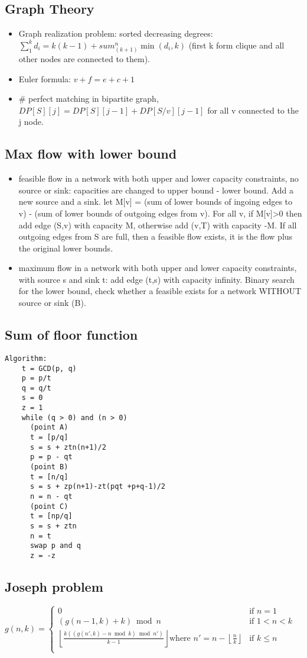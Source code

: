 \subsection{Graph Theory}
\begin{itemize}
\item Graph realization problem: sorted decreasing degrees: $\sum_1^k d_i = k(k-1)+sum_(k+1)^n \min(d_i,k)$ (first k form clique and all other nodes are connected to them).
\item Euler formula: $v+f = e+c+1$
\item \# perfect matching in bipartite graph, $DP[S][j] = DP[S][j-1] + DP[S/{v}][j-1]$ for all v connected to the j node.
\end{itemize}
\hrulefill
\subsection{Max flow with lower bound}
\begin{itemize}
\item feasible flow in a network with both upper and lower capacity constraints, no source or sink: capacities are changed to upper bound - lower bound. Add a new source and a sink. let M[v] = (sum of lower bounds of ingoing edges to v) - (sum of lower bounds of outgoing edges from v). For all v, if M[v]>0 then add edge (S,v) with capacity M, otherwise add (v,T) with capacity -M. If all outgoing edges from S are full, then a feasible flow exists, it is the flow plus the original lower bounds.
\item maximum flow in a network with both upper and lower capacity constraints, with source s and sink t: add edge (t,s) with capacity infinity. Binary search for the lower bound, check whether a feasible exists for a network WITHOUT source or sink (B).
\end{itemize}
\hrulefill
\subsection{Sum of floor function}
\raggedbottom\begin{lstlisting}[style=txt]
Algorithm:
    t = GCD(p, q)
    p = p/t
    q = q/t
    s = 0
    z = 1
    while (q > 0) and (n > 0)
      (point A)
      t = [p/q]
      s = s + ztn(n+1)/2
      p = p - qt
      (point B)
      t = [n/q]
      s = s + zp(n+1)-zt(pqt +p+q-1)/2
      n = n - qt
      (point C)
      t = [np/q]
      s = s + ztn
      n = t
      swap p and q
      z = -z
\end{lstlisting}
\hrulefill
\subsection{Joseph problem}
${\displaystyle g(n,k)={\begin{cases}
 0 & {\text{if }}n=1\\
 (g(n-1,k)+k){\bmod {n}}&{\text{if }} 1<n<k\\
 \left\lfloor {\frac {k((g(n',k)-n{\bmod {k}}){\bmod {n}}')}{k-1}}\right\rfloor {\text{where }}n'=n-\left\lfloor {\frac {n}{k}}\right\rfloor &{\text{if }}k\leq n\\
 \end{cases}}}$\\
\hrulefill